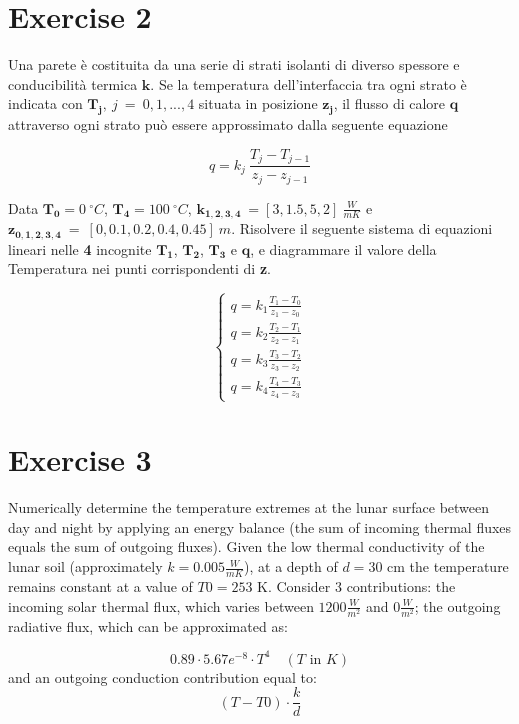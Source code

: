\documentclass[oneside]{article}
\begin{document}
\section*{Exercise 2}
Una parete è costituita da una serie di strati isolanti di diverso spessore e
conducibilità termica $\mathbf{k}$. Se la temperatura dell'interfaccia tra ogni strato è
indicata con $\mathbf{T_{j}},\:j\:=\:0, 1, ... , 4$ situata in posizione
$\mathbf{z_{j}}$, il flusso di calore $\mathbf{q}$ attraverso ogni strato può essere
approssimato dalla seguente equazione

\begin{equation*}
   q = k_{j} \: \frac{T_{j}-T_{j-1}}{z_{j} - z_{j-1}}
\end{equation*}

\noindent Data $\mathbf{T_{0}}=0\: ^{\circ}C$, $\mathbf{T_{4}}=100\: ^{\circ}C$,
$\mathbf{k_{1,2,3,4}}\:=[3,1.5,5,2]\:\frac{W}{mK}$ e
$\mathbf{z_{0,1,2,3,4}}\:=\:[0,0.1,0.2,0.4,0. 45]\:m$. Risolvere il seguente sistema di
equazioni lineari nelle \textbf{4} incognite $\mathbf{T_{1}}$, $\mathbf{T_{2}}$,
$\mathbf{T_{3}}$ e $\mathbf{q}$, e diagrammare il valore della Temperatura nei punti
corrispondenti di \textbf{z}.

\begin{equation*}
   \begin{cases}
      q = k_{1}\frac{T_{1}-T_{0}}{z_{1}-z_{0}}\\
      q = k_{2}\frac{T_{2}-T_{1}}{z_{2}-z_{1}}\\
      q = k_{3}\frac{T_{3}-T_{2}}{z_{3}-z_{2}}\\
      q = k_{4}\frac{T_{4}-T_{3}}{z_{4}-z_{3}}
   \end{cases}
\end{equation*}
%
%

\section*{Exercise 3}
Numerically determine the temperature extremes at the lunar surface between day and night
by applying an energy balance (the sum of incoming thermal fluxes equals the sum of
outgoing fluxes). Given the low thermal conductivity of the lunar soil (approximately $k
= 0.005 \frac{W}{mK}$), at a depth of $d = 30$ cm the temperature remains constant at a
value of $T0 = 253$ K. Consider 3 contributions: the incoming solar thermal flux, which
varies between $1200 \frac{W}{m^2}$ and $0 \frac{W}{m^2}$; the outgoing radiative flux,
which can be approximated as:

\begin{equation}
   0.89 \cdot 5.67e^{-8} \cdot T^4 \quad (T \text{ in } K)
\end{equation}
\noindent and an outgoing conduction contribution equal to:
\begin{equation}
   (T - T0) \cdot \frac{k}{d}
\end{equation}
\end{document}
